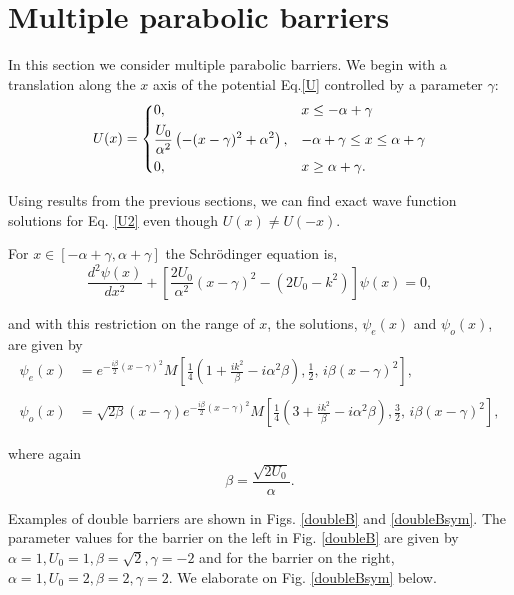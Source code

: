 \documentclass{article}
\numberwithin{equation}{section}
\begin{document}
\section{Multiple parabolic barriers}\label{MulBar}

In this section we consider multiple parabolic barriers. We begin with a translation along the $x$ axis of the potential Eq.\eqref{U} controlled by a parameter $\gamma$:
\begin{equation}
U(x)=
\begin{dcases}
0, &x\leq -\alpha+\gamma\\
\frac{U_0}{\alpha^2}\left(-(x-\gamma)^2+\alpha^2\right),&-\alpha+\gamma\leq x\leq\alpha+\gamma \label{U2}\\
0, &x\geq\alpha+\gamma.\\ 
\end{dcases}
\end{equation}

Using results from the previous sections, we can find exact wave function solutions for Eq. \eqref{U2} even though $U(x)\neq U(-x)$.

For $x\in\left[-\alpha+\gamma,\alpha+\gamma\right]$ the Schr\"odinger equation is,
\begin{equation}
\frac{d^2 \psi(x)}{dx^2}+\left[\frac{2U_0}{\alpha^2}(x-\gamma)^2 -(2U_0-k^2)\right]\psi(x)=0,\label{S3}
\end{equation}

and with this restriction on the range of $x$, the solutions, $\psi_e(x)$ and $\psi_o(x)$, are given by
\begin{align}
\psi_e(x)&=e^{-\frac{i\beta}{2}(x-\gamma)^2}M\left[\frac{1}{4}\!\left(1+\frac{ik^2}{\beta}-i\alpha^2\beta\right),\frac{1}{2},\,i\beta (x-\gamma)^2\right],\label{psie2}\\\nonumber\\
\psi_o(x)&=\sqrt{2\beta}(x-\gamma)e^{-\frac{i\beta}{2}(x-\gamma)^2}M\left[\frac{1}{4}\!\left(3+\frac{ik^2}{\beta}-i\alpha^2\beta\right),\frac{3}{2},\,i\beta (x-\gamma)^2\right],\label{psio2}
\end{align}

where again
\begin{equation}
\beta=\frac{\sqrt{2U_0}}{\alpha}.\label{beta1}
\end{equation}

Examples of double barriers are shown in Figs. \ref{doubleB} and \ref{doubleBsym}. The parameter values for the barrier on the left in Fig. \ref{doubleB} are given by $\alpha=1, U_0=1, \beta=\sqrt{2}, \gamma=-2$ and for the barrier on the right, $\alpha=1, U_0=2, \beta=2, \gamma=2$.  We elaborate on Fig. \ref{doubleBsym} below.
\end{document}
